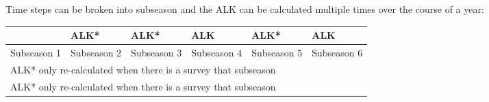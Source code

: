 Time steps can be broken into subseason and the ALK can be calculated multiple times over the course of a year:
\vspace*{-\baselineskip}
\vspace*{-\baselineskip}
\begin{center}
	\begin{tabular}{|p{2.37cm}|p{2.37cm}|p{2.37cm}|p{2.37cm}|p{2.37cm}|p{2.37cm}|}
	\begin{tabular}{|p{2.37cm}|p{2.37cm}|p{2.37cm}|p{2.37cm}|p{2.37cm}|p{2.37cm}|}
		\hline
		ALK & ALK* & ALK* & ALK & ALK* & ALK \Tstrut\Bstrut\\
		\hline
		Subseason 1 & Subseason 2 & Subseason 3 & Subseason 4 & Subseason 5 & Subseason 6 \Tstrut\Bstrut\\		
		\hline
		\multicolumn{6}{l}{ALK* only re-calculated when there is a survey that subseason} \Tstrut\Bstrut\\		
		\multicolumn{6}{l}{ALK* only re-calculated when there is a survey that subseason} \Tstrut\Bstrut\\		
	\end{tabular}
\end{center}

